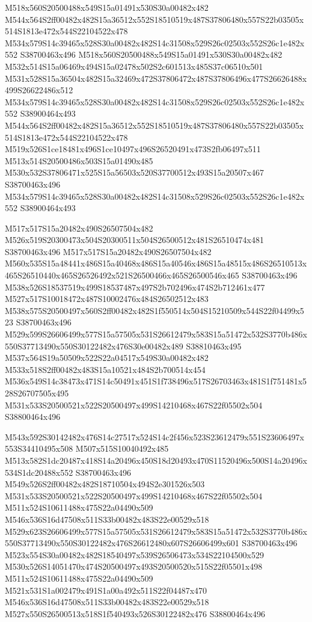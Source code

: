 \documentclass{article}
\begin{document}
\begin{multicols}{2}
M518x560S20500488x549S15a01491x530S30a00482x482 M544x564S2ff00482x482S15a36512x552S18510519x487S37806480x557S22b03505x514S1813e472x544S22104522x478 M534x579S14c39465x528S30a00482x482S14c31508x529S26c02503x552S26c1e482x552 S38700463x496 M518x560S20500488x549S15a01491x530S30a00482x482 M532x514S15a06469x494S15a02478x502S2c601513x485S37c06510x501 M531x528S15a36504x482S15a32469x472S37806472x487S37806496x477S26626488x499S26622486x512 M534x579S14c39465x528S30a00482x482S14c31508x529S26c02503x552S26c1e482x552 S38900464x493 M544x564S2ff00482x482S15a36512x552S18510519x487S37806480x557S22b03505x514S1813e472x544S22104522x478 M519x526S1ce18481x496S1ce10497x496S26520491x473S2fb06497x511 M513x514S20500486x503S15a01490x485 M530x532S37806471x525S15a56503x520S37700512x493S15a20507x467 S38700463x496 M534x579S14c39465x528S30a00482x482S14c31508x529S26c02503x552S26c1e482x552 S38900464x493

M517x517S15a20482x490S26507504x482 M526x519S20300473x504S20300511x504S26500512x481S26510474x481 S38700463x496 M517x517S15a20482x490S26507504x482 M560x535S15a48441x486S15a40468x486S15a40546x486S15a48515x486S26510513x465S26510440x465S26526492x521S26500466x465S26500546x465 S38700463x496 M538x526S18537519x499S18537487x497S2b702496x474S2b712461x477 M527x517S10018472x487S10002476x484S26502512x483 M538x575S20500497x560S2ff00482x482S1f550514x504S15210509x544S22f04499x523 S38700463x496 M529x599S26606499x577S15a57505x531S26612479x583S15a51472x532S3770b486x550S37713490x550S30122482x476S30e00482x489 S38810463x495 M537x564S19a50509x522S22a04517x549S30a00482x482 M533x518S2ff00482x483S15a10521x484S2b700514x454 M536x549S14c38473x471S14c50491x451S1f738496x517S26703463x481S1f751481x528S26707505x495 M531x533S20500521x522S20500497x499S14210468x467S22f05502x504 S38800464x496

M543x592S30142482x476S14c27517x524S14c2f456x523S23612479x551S23606497x553S34410495x508 M507x515S10040492x485 M513x582S1dc20487x418S14a20496x450S18d20493x470S11520496x500S14a20496x534S1dc20488x552 S38700463x496 M549x526S2ff00482x482S18710504x494S2e301526x503 M531x533S20500521x522S20500497x499S14210468x467S22f05502x504 M511x524S10611488x475S22a04490x509 M546x536S16d47508x511S33b00482x483S22e00529x518 M529x623S26606499x577S15a57505x531S26612479x583S15a51472x532S3770b486x550S37713490x550S30122482x476S26612480x607S26606499x601 S38700463x496 M523x554S30a00482x482S18540497x539S26506473x534S22104500x529 M530x526S14051470x474S20500497x493S20500520x515S22f05501x498 M511x524S10611488x475S22a04490x509 M521x531S1a002479x491S1a00a492x511S22f04487x470 M546x536S16d47508x511S33b00482x483S22e00529x518 M527x550S26500513x518S1f540493x526S30122482x476 S38800464x496


\end{multicols}
\end{document}
